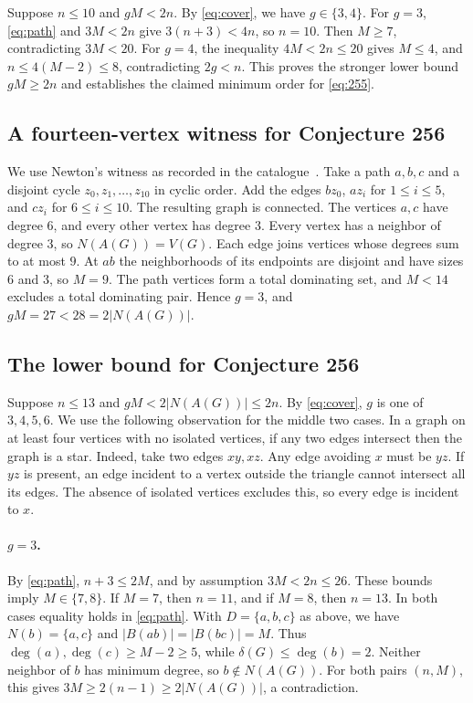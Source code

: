 \documentclass[11pt]{article}
\begin{document}
Suppose \(n\le10\) and \(gM<2n\). By \eqref{eq:cover}, we have
\(g\in\{3,4\}\). For \(g=3\), \eqref{eq:path} and \(3M<2n\)
give \(3(n+3)<4n\), so \(n=10\). Then \(M\ge7\), contradicting
\(3M<20\). For \(g=4\), the inequality \(4M<2n\le20\) gives
\(M\le4\), and \(n\le4(M-2)\le8\), contradicting \(2g<n\).
This proves the stronger lower bound \(gM\ge2n\) and establishes
the claimed minimum order for \eqref{eq:255}.

\subsection{A fourteen-vertex witness for Conjecture 256}

We use Newton's witness as recorded in the catalogue~\cite{newton256}.
Take a path \(a,b,c\) and a disjoint cycle \(z_0,z_1,\ldots,z_{10}\)
in cyclic order. Add the edges \(bz_0\), \(az_i\) for \(1\le i\le5\),
and \(cz_i\) for \(6\le i\le10\). The resulting graph is connected.
The vertices \(a,c\) have degree \(6\), and every other vertex has
degree \(3\). Every vertex has a neighbor of degree \(3\), so
\(N(A(G))=V(G)\). Each edge joins vertices whose degrees sum to
at most \(9\). At \(ab\) the neighborhoods of its endpoints
are disjoint and have sizes \(6\) and \(3\), so \(M=9\).
The path vertices form a total dominating set, and \(M<14\)
excludes a total dominating pair. Hence \(g=3\), and
\(gM=27<28=2|N(A(G))|\).

\subsection{The lower bound for Conjecture 256}

Suppose \(n\le 13\) and \(gM<2|N(A(G))|\le 2n\).
By \eqref{eq:cover}, \(g\) is one of \(3,4,5,6\).
We use the following observation for the middle two cases.
In a graph on at least four vertices with no isolated vertices,
if any two edges intersect then the graph is a star. Indeed, take
two edges \(xy,xz\). Any edge avoiding \(x\) must be \(yz\).
If \(yz\) is present, an edge incident to a vertex outside the
triangle cannot intersect all its edges. The absence of isolated
vertices excludes this, so every edge is incident to \(x\).

\paragraph{\(g=3\).}
By \eqref{eq:path}, \(n+3\le2M\), and by assumption \(3M<2n\le26\).
These bounds imply \(M\in\{7,8\}\). If \(M=7\), then \(n=11\),
and if \(M=8\), then \(n=13\). In both cases equality holds
in \eqref{eq:path}. With \(D=\{a,b,c\}\) as above, we have
\(N(b)=\{a,c\}\) and \(|B(ab)|=|B(bc)|=M\). Thus
\(\deg(a),\deg(c)\ge M-2\ge5\), while \(\delta(G)\le\deg(b)=2\).
Neither neighbor of \(b\) has minimum degree, so \(b\notin N(A(G))\).
For both pairs \((n,M)\), this gives
\(3M\ge2(n-1)\ge2|N(A(G))|\), a contradiction.
\end{document}
